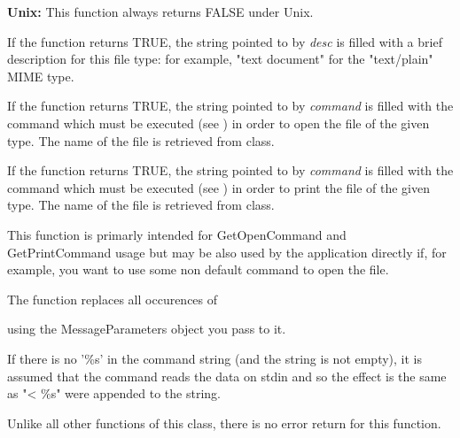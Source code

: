 {\bf Unix:} This function always returns FALSE under Unix.

\label{wxfiletypegetdescription}


If the function returns TRUE, the string pointed to by {\it desc} is filled
with a brief description for this file type: for example, "text document" for
the "text/plain" MIME type.

\label{wxfiletypegetopencommand}


If the function returns TRUE, the string pointed to by {\it command} is filled
with the command which must be executed (see ) in
order to open the file of the given type. The name of the file is
retrieved from  class.

\label{wxfiletypegetprintcommand}


If the function returns TRUE, the string pointed to by {\it command} is filled
with the command which must be executed (see ) in
order to print the file of the given type. The name of the file is
retrieved from  class.

\label{wxfiletypeexpandcommand}


This function is primarly intended for GetOpenCommand and GetPrintCommand
usage but may be also used by the application directly if, for example, you want
to use some non default command to open the file.

The function replaces all occurences of

\twocolwidtha{7cm}
\begin{twocollist}\itemsep=0pt
\end{twocollist}

using the MessageParameters object you pass to it.

If there is no '\%s' in the command string (and the string is not empty), it is
assumed that the command reads the data on stdin and so the effect is the same
as "< \%s" were appended to the string.

Unlike all other functions of this class, there is no error return for this
function.

